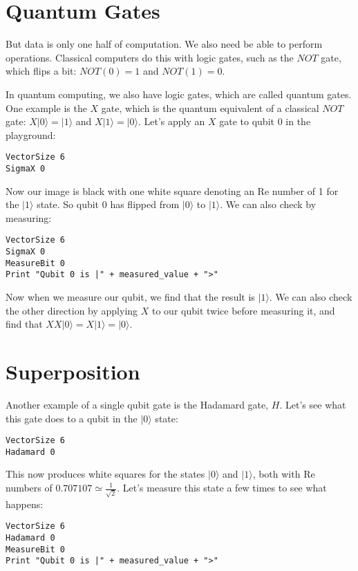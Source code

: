 \documentclass[twocolumn]{article}
\begin{document}
\section{Quantum Gates}

But data is only one half of computation. We also need be able to perform operations. Classical computers do this with logic gates, such as the $NOT$ gate, which flips a bit: $NOT(0) = 1$ and $NOT(1) = 0$.

In quantum computing, we also have logic gates, which are called quantum gates. One example is the $X$ gate, which is the quantum equivalent of a classical $NOT$ gate: $X|0\rangle = |1\rangle$ and $X|1\rangle = |0\rangle$. Let's apply an $X$ gate to qubit $0$ in the playground:

\begin{lstlisting}
VectorSize 6
SigmaX 0
\end{lstlisting}

Now our image is black with one white square denoting an Re number of 1 for the $|1\rangle$ state. So qubit $0$ has flipped from $|0\rangle$ to $|1\rangle$. We can also check by measuring:

\begin{lstlisting}
VectorSize 6
SigmaX 0
MeasureBit 0
Print "Qubit 0 is |" + measured_value + ">"
\end{lstlisting}

Now when we measure our qubit, we find that the result is $|1\rangle$. We can also check the other direction by applying $X$ to our qubit twice before measuring it, and find that $XX|0\rangle = X|1\rangle = |0\rangle$.

\section{Superposition}
\label{sec:superposition}

Another example of a single qubit gate is the Hadamard gate, $H$. Let's see what this gate does to a qubit in the $|0\rangle$ state:

\begin{lstlisting}
VectorSize 6
Hadamard 0
\end{lstlisting}

This now produces white squares for the states $|0\rangle$ and $|1\rangle$, both with Re numbers of $0.707107 \simeq \frac{1}{\sqrt{2}}$. Let's measure this state a few times to see what happens:

\begin{lstlisting}
VectorSize 6
Hadamard 0
MeasureBit 0
Print "Qubit 0 is |" + measured_value + ">"
\end{lstlisting}
\end{document}
